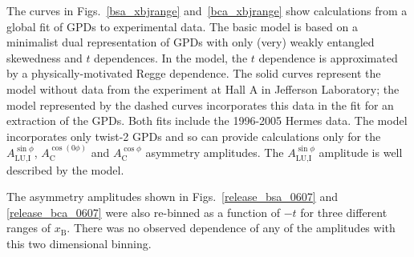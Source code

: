 The curves in Figs.~\ref{bsa_xbjrange} and~\ref{bca_xbjrange} show calculations from a global fit of GPDs to experimental data\cite{Kumericki}. The basic model is based on a minimalist dual representation of GPDs with only (very) weakly entangled skewedness and $t$ dependences. In the model, the $t$ dependence is approximated by a physically-motivated Regge dependence. The solid curves represent the model  without data from the experiment \cite{Girod2007} at Hall A in Jefferson Laboratory; the model  represented by the dashed curves incorporates this data in the fit for an extraction of the GPDs. Both fits include the 1996-2005 H{\sc ermes} data. The model incorporates only twist-2 GPDs and so can provide calculations only for the $A_{\textrm{LU,I}}^{\sin\phi}$, $A_{\textrm{C}}^{\cos(0\phi)}$ and $A_{\textrm{C}}^{\cos\phi}$ asymmetry amplitudes. The $A_{\textrm{LU,I}}^{\sin\phi}$ amplitude is well described by the model. 

The asymmetry amplitudes shown in Figs.~\ref{release_bsa_0607} and \ref{release_bca_0607} were also re-binned as a function of $-t$ for three different ranges of $x_{\textrm{B}}$. There was no observed dependence of any of the amplitudes with this two dimensional binning.
